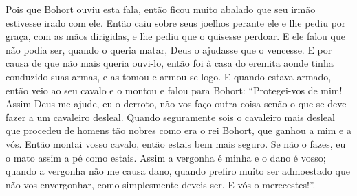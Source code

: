 Pois que Bohort ouviu esta fala, então ficou muito abalado que seu irmão
estivesse irado com ele. Então caiu sobre seus joelhos perante ele e lhe pediu
por graça, com as mãos dirigidas, e lhe pediu que o quisesse perdoar. E ele
falou que não podia ser, quando o queria matar, Deus o ajudasse que o vencesse.
E por causa de que não mais queria ouvi-lo, então foi à casa do eremita aonde
tinha conduzido suas armas, e as tomou e armou-se logo. E quando estava armado,
então veio ao seu cavalo e o montou e falou para Bohort: “Protegei-vos de mim!
Assim Deus me ajude, eu o derroto, não vos faço outra coisa senão o que se deve
fazer a um cavaleiro desleal. Quando seguramente sois o cavaleiro mais desleal
que procedeu de homens tão nobres como era o rei Bohort, que ganhou a mim e a
vós. Então montai vosso cavalo, então estais bem mais seguro. Se não o
fazes, eu o mato assim a pé como estais. Assim a vergonha é minha e o dano é
vosso; quando a vergonha não me causa dano, quando prefiro muito ser admoestado
que não vos envergonhar, como simplesmente deveis ser. E vós o merecestes!”. 

